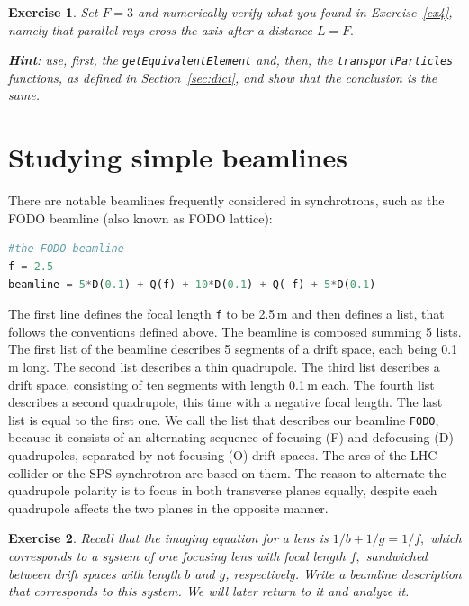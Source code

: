 \documentclass{article}
\newtheorem{exercise}{Exercise}
\begin{document}
\begin{exercise}
 Set $F=3$ and numerically verify what you found in Exercise~\ref{ex4}, 
  namely that parallel rays cross the axis after a distance $L=F.$ 
  
  \textbf{Hint}: use, first, the \texttt{getEquivalentElement} and, then, the \texttt{transportParticles} functions, as defined in Section~\ref{sec:dict}, and show that the conclusion is the same.
\end{exercise}

\section{Studying simple beamlines}

There are notable beamlines frequently considered in synchrotrons, such as the FODO beamline (also known as FODO lattice):
\begin{lstlisting}[language=Python]
#the FODO beamline
f = 2.5
beamline = 5*D(0.1) + Q(f) + 10*D(0.1) + Q(-f) + 5*D(0.1)
\end{lstlisting}
The first line defines the focal length {\tt f} to be 2.5\,m and then defines
a list, that follows the conventions defined above. The beamline is composed summing 5 lists. 
The first list of the beamline describes 5 segments of a drift space, each being 0.1\,m long. The second 
list describes a thin quadrupole. The third list describes a drift space, consisting of ten 
segments with length 0.1\,m each. The fourth list
describes a second quadrupole, this time with a negative focal length. The last list is
equal to the first one. We call the list that describes our beamline {\tt FODO}, because 
it consists of an alternating sequence of focusing (F) and defocusing (D) quadrupoles,
separated by not-focusing (O) drift spaces. The arcs of the LHC collider or the SPS synchrotron are based on them. The reason to alternate the quadrupole
polarity is to focus in both transverse planes equally, despite  each quadrupole affects
the two planes in the opposite manner.
\begin{exercise}
Recall that the imaging equation for a lens is $1/b+1/g=1/f,$
  which corresponds to a system of one focusing lens with focal length $f,$ sandwiched
  between drift spaces with length $b$ and $g$, respectively. Write a beamline
  description that corresponds to this system. We will later return to it and analyze it. 
\end{exercise}
\end{document}
